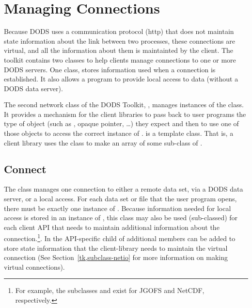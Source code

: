%
%
%
%
%
%
%
%

\chapter{Managing Connections}
\label{pguide,connect}
\label{tk,manage-conns}

Because DODS uses a communication protocol (http) that does not
maintain state information about the link between two processes, these
connections are virtual, and all the information about them is
maintainted by the client.  The toolkit contains two classes to help
clients manage connections to one or more DODS servers.  One class,
 stores information used when a connection is
established. It also allows a program to provide local access to data
(without a DODS data server).

The second network class of the DODS Toolkit, ,
manages instances of the  class. It provides a
mechanism for the client libraries to pass back to user programs the
type of object (such as , opaque pointer, \ldots) they expect and
then to use one of those objects to access the correct instance of
.   is a template class. That is, a
client library uses the  class to make an array of
some sub-class of .

\section{Connect}

The  class manages one connection to either a remote
data set, via a DODS data server, or a local access. For each data set
or file that the user program opens, there must be exactly one
instance of . Because information needed for local
access is stored in an instance of , this class may
also be used (sub-classed) for each client API that needs to maintain
additional information about the connection.\footnote{For example, the 
  subclasses  and  exist for JGOFS and
  NetCDF, respectively.}. In the API-specific child of 
additional members can be added to store state information that the
client-library needs to maintain the virtual connection (See
Section~\ref{tk,subclass-netio} for more information on making
virtual connections).

